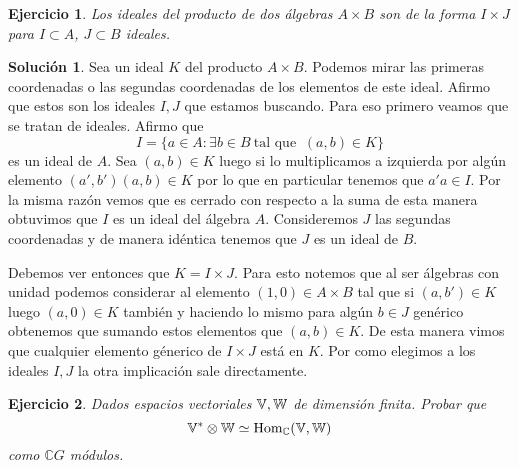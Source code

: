 \documentclass[11pt]{article}
\theoremstyle{plain}
\newtheorem*{ej}{Ejercicio}
\theoremstyle{definition}
\newtheorem*{sol}{Solución}
\theoremstyle{remark}
\newcommand\VV{\mathbb{V}}
\newcommand\WW{\mathbb{W}}
\newcommand\CC{\mathbb{C}}
\begin{document}
\newpage
\begin{tcolorbox}[colback=teal!25!white,colframe=teal!75!black]
	\begin{ej}
		Los ideales del producto de dos álgebras $A \times B$ son de la forma $I \times J$ para $I \subset A$, $J \subset B$ ideales.
	\end{ej}	
\end{tcolorbox}
\medskip

\begin{sol}
	Sea un ideal $K$ del producto $A \times B$. Podemos mirar las primeras coordenadas o las segundas coordenadas de los elementos de este ideal. Afirmo que estos son los ideales $I,J$ que estamos buscando. Para eso primero veamos que se tratan de ideales. Afirmo que $$I= \{ a\in A : \exists b \in B \ \text{tal que } \ (a,b) \in K  \} $$ es un ideal de $A$. Sea $(a,b) \in K$ luego si lo multiplicamos a izquierda por algún elemento $(a',b')(a,b) \in K$ por lo que en particular tenemos que $a'a \in I$. Por la misma razón vemos que es cerrado con respecto a la suma de esta manera obtuvimos que $I$ es un ideal del álgebra $A$. Consideremos $J$ las segundas coordenadas y de manera idéntica tenemos que $J$ es un ideal de $B$.
	
	Debemos ver entonces que $K = I \times J$. Para esto notemos que al ser álgebras con unidad podemos considerar al elemento $(1,0) \in A \times B$ tal que si $(a,b') \in K$ luego $(a,0) \in K$ también y haciendo lo mismo para algún $b \in J$ genérico obtenemos que sumando estos elementos que $(a,b) \in K$. De esta manera vimos que cualquier elemento génerico de $I \times J$ está en $K$. Por como elegimos a los ideales $I,J$ la otra implicación sale directamente.
	
\end{sol}	

\medskip
\begin{tcolorbox}[colback=teal!25!white,colframe=teal!75!black]
	\begin{ej}
		Dados espacios vectoriales $\Bbb {\VV, \WW}$ de dimensión finita. Probar que $$ \Bbb V^* \otimes \WW  \simeq \text{Hom}_\CC (\Bbb V, \Bbb W)  $$ como $\CC G$ módulos.
	\end{ej}	
\end{tcolorbox}
\medskip
\end{document}
